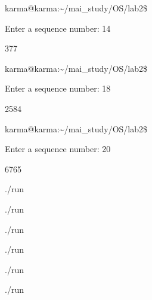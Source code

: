 \documentclass[a4paper,portrait,12pt]{article}
\begin{document}
\begin{flushleft}
karma@karma:\~{}/mai\_study/OS/lab2\$
\end{flushleft}


\begin{flushleft}
Enter a sequence number: 14
\end{flushleft}


377


\begin{flushleft}
karma@karma:\~{}/mai\_study/OS/lab2\$
\end{flushleft}


\begin{flushleft}
Enter a sequence number: 18
\end{flushleft}


2584


\begin{flushleft}
karma@karma:\~{}/mai\_study/OS/lab2\$
\end{flushleft}


\begin{flushleft}
Enter a sequence number: 20
\end{flushleft}


6765





\begin{flushleft}
./run
\end{flushleft}





\begin{flushleft}
./run
\end{flushleft}





\begin{flushleft}
./run
\end{flushleft}





\begin{flushleft}
./run
\end{flushleft}





\begin{flushleft}
./run
\end{flushleft}





\begin{flushleft}
./run
\end{flushleft}
\end{document}

